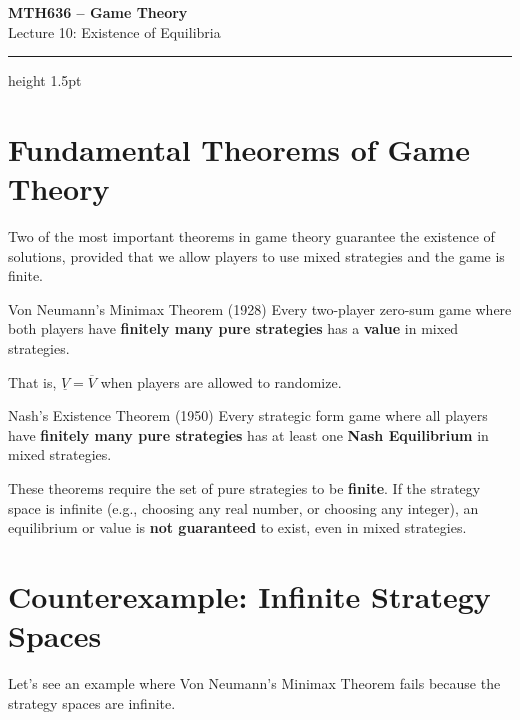 \documentclass[12pt, a4paper]{article}
\begin{document}
\begin{center}
  {\LARGE\bfseries\sffamily\color{defblue} MTH636 -- Game Theory}\\[6pt]
  {\Large\sffamily Lecture 10: Existence of Equilibria}\\[4pt]
\end{center}
\vspace{0.5cm}
\hrule height 1.5pt
\vspace{0.3cm}

\section{Fundamental Theorems of Game Theory}

Two of the most important theorems in game theory guarantee the existence of solutions, provided that we allow players to use mixed strategies and the game is finite.

\begin{thmbox}{Von Neumann's Minimax Theorem (1928)}
  Every two-player zero-sum game where both players have \textbf{finitely many pure strategies} has a \textbf{value} in mixed strategies.
  
  That is, $\underline{V} = \overline{V}$ when players are allowed to randomize.
\end{thmbox}

\begin{thmbox}{Nash's Existence Theorem (1950)}
  Every strategic form game where all players have \textbf{finitely many pure strategies} has at least one \textbf{Nash Equilibrium} in mixed strategies.
\end{thmbox}

\begin{notebox}
  These theorems require the set of pure strategies to be \textbf{finite}. If the strategy space is infinite (e.g., choosing any real number, or choosing any integer), an equilibrium or value is \textbf{not guaranteed} to exist, even in mixed strategies.
\end{notebox}

\section{Counterexample: Infinite Strategy Spaces}

Let's see an example where Von Neumann's Minimax Theorem fails because the strategy spaces are infinite.
\end{document}

